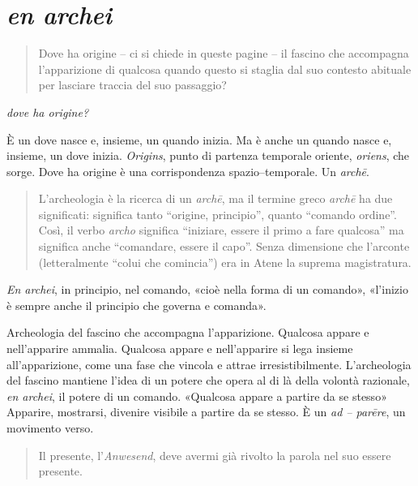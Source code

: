 \section{\emph{en archei}}

\begin{quote}
\begin{sf}
\small
Dove ha origine – ci si chiede in queste pagine – il fascino che accompagna l'apparizione di qualcosa quando questo si staglia dal suo contesto abituale per lasciare traccia del suo passaggio?
\end{sf}
\end{quote}

\emph{dove ha origine?}

È un dove nasce e, insieme, un quando inizia. Ma è anche un quando nasce e, insieme, un dove inizia. \emph{Origins}, punto di partenza temporale oriente, \emph{oriens}, che sorge. Dove ha origine è una corrispondenza spazio–temporale. Un \emph{archē}.


\begin{quote}
\begin{sf}
\small
L'archeologia è la ricerca di un \emph{archē}, ma il termine greco \emph{archē} ha due significati: significa tanto “origine, principio”, quanto “comando ordine”. Così, il verbo \emph{archo} significa “iniziare, essere il primo a fare qualcosa” ma significa anche “comandare, essere il capo”. Senza dimensione che l'arconte (letteralmente “colui che comincia”) era in Atene la suprema magistratura. \cite{agamben17}
\end{sf}
\end{quote}

\emph{En archei}, in principio, nel comando, «cioè nella forma di un comando», «l'inizio è sempre anche il principio che governa e comanda».

Archeologia del fascino che accompagna l'apparizione. Qualcosa appare e nell'apparire ammalia. Qualcosa appare e nell'apparire si lega insieme all'apparizione, come una fase che vincola e attrae irresistibilmente. L'archeologia del fascino mantiene l'idea di un potere che opera al di là della volontà razionale, \emph{en archei}, il potere di un comando. «Qualcosa appare a partire da se stesso» \cite{agamben19} Apparire, mostrarsi, divenire visibile a partire da se stesso. È un \emph{ad – parēre}, un movimento verso.

\begin{quote}
\begin{sf}
\small
Il presente, l'\emph{Anwesend}, deve avermi già rivolto la parola nel suo essere presente. \cite{agamben19}
\end{sf}
\end{quote}


